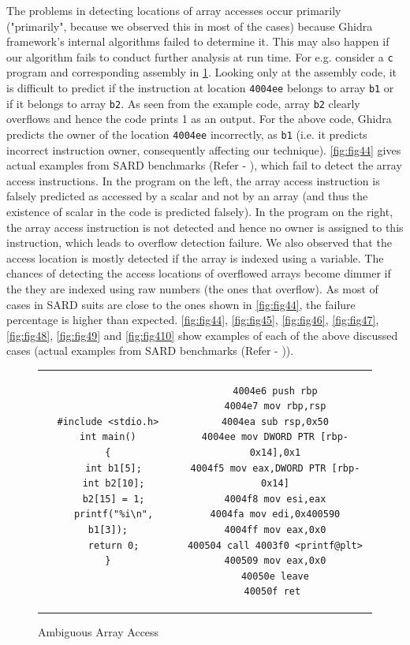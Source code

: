 The problems in detecting locations of array accesses occur primarily ("primarily", because we observed this in most of the cases) because Ghidra framework's internal algorithms failed to determine it. This may also happen if our algorithm fails to conduct further analysis at run time. For e.g. consider a \texttt{c} program and corresponding assembly in \cref{fig:fig43}. Looking only at the assembly code, it is difficult to predict if the instruction at location \texttt{4004ee} belongs to array \texttt{b1} or if it belongs to array \texttt{b2}. As seen from the example code, array \texttt{b2} clearly overflows and hence the code prints 1 as an output. For the above code, Ghidra predicts the owner of the location \texttt{4004ee} incorrectly, as \texttt{b1} (i.e. it predicts incorrect instruction owner, consequently affecting our technique). \cref{fig:fig44} gives actual examples from SARD benchmarks (Refer - \citep{black2017sard} \citep{sardcite}), which fail to detect the array access instructions. In the program on the left, the array access instruction is falsely predicted as accessed by a scalar and not by an array (and thus the existence of scalar in the code is predicted falsely). In the program on the right, the array access instruction is not detected and hence no owner is assigned to this instruction, which leads to overflow detection failure. We also observed that the access location is mostly detected if the array is indexed using a variable. The chances of detecting the access locations of overflowed arrays become dimmer if the they are indexed using raw numbers (the ones that overflow). As most of cases in SARD suits are close to the ones shown in \cref{fig:fig44}, the failure percentage is higher than expected. \cref{fig:fig44}, \cref{fig:fig45}, \cref{fig:fig46}, \cref{fig:fig47}, \cref{fig:fig48}, \cref{fig:fig49} and \cref{fig:fig410} show examples of each of the above discussed cases (actual examples from SARD benchmarks (Refer - \citep{black2017sard} \citep{sardcite})).

\begin{figure}
\begin{centering}
\begin{tabular}{ c | c }
\begin{lstlisting}
#include <stdio.h>
int main()
{
  int b1[5];
  int b2[10];
  b2[15] = 1;
  printf("%i\n", b1[3]);
  return 0;
}
\end{lstlisting}
&
\begin{lstlisting}
4004e6 push rbp
4004e7 mov rbp,rsp
4004ea sub rsp,0x50
4004ee mov DWORD PTR [rbp-0x14],0x1
4004f5 mov eax,DWORD PTR [rbp-0x14]
4004f8 mov esi,eax
4004fa mov edi,0x400590
4004ff mov eax,0x0
400504 call 4003f0 <printf@plt>
400509 mov eax,0x0
40050e leave
40050f ret 
\end{lstlisting}
\end{tabular}
\caption{Ambiguous Array Access\label{fig:fig43}}
\par\end{centering}
\end{figure}


